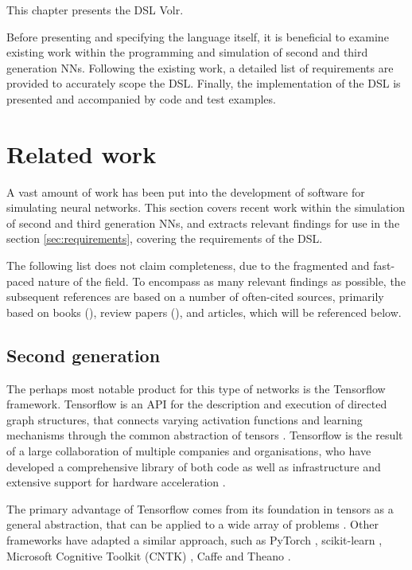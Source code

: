 \documentclass[report.tex]{subfiles}
\begin{document}
This chapter presents the \gls{DSL} Volr. 

Before presenting and specifying the language itself, 
it is beneficial to examine existing work within the
programming and simulation of second and third
generation \glspl{NN}.
Following the existing work, a detailed list of requirements
are provided to accurately scope the \gls{DSL}.
Finally, the implementation of the \gls{DSL} is presented and
accompanied by code and test examples.

\section{Related work}
A vast amount of work has been put into the development of software for simulating
neural networks.
This section covers recent work within the simulation of second and third
generation \glspl{NN}, and extracts relevant findings for use in the section \ref{sec:requirements}, covering the requirements of the DSL.

The following list does not claim completeness, due to the fragmented and 
fast-paced nature of the field.
To encompass as many relevant findings as possible, the subsequent
references are based on a number of often-cited sources, primarily based on books
(\cite{Bishop2006, Russel2007, Eliasmith2015, Lin2018, Nilsson2009, Pearl1988, Rojas1996, Rumelhart1988}), review papers 
(\cite{Schmidhuber2014, Blundell2018, Markram2013, Walter2015, Hunsberger2015}),
and articles, which will be referenced below.

\subsection{Second generation}
The perhaps most notable product for this type of networks is the Tensorflow 
framework.\cite{Abadi2016}
Tensorflow is an \gls{API} for the description and execution of directed graph 
structures,
that connects varying activation functions and learning mechanisms through the common abstraction
of tensors \cite{Abadi2015}.
Tensorflow is the result of a large collaboration of multiple companies and organisations, who have
developed a comprehensive library of both code as well as infrastructure and extensive support for hardware acceleration \cite{Abadi2015}.

The primary advantage of Tensorflow  comes from 
its foundation in tensors as a general abstraction, that
can be applied to a wide array of problems \cite{Abadi2016}.
Other frameworks have adapted a similar approach, such as PyTorch \cite{PyTorch2018}, 
scikit-learn \cite{Sklearn2018}, Microsoft Cognitive Toolkit (CNTK) \cite{CNTK2018},
Caffe \cite{Caffe2018} and Theano \cite{Theano2018}.
\end{document}
